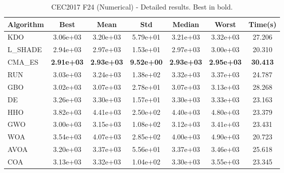 \begin{table}[H]
\centering\small
\caption{CEC2017 F24 (Numerical) - Detailed results. Best in bold.}
\label{tab:cec2017_F24}
\begin{tabular}{lcccccc}
\toprule
\textbf{Algorithm} & \textbf{Best} & \textbf{Mean} & \textbf{Std} & \textbf{Median} & \textbf{Worst} & \textbf{Time(s)} \\
\midrule
KDO & 3.06e+03 & 3.20e+03 & 5.79e+01 & 3.21e+03 & 3.32e+03 & 27.206 \\
L_SHADE & 2.94e+03 & 2.97e+03 & 1.53e+01 & 2.97e+03 & 3.00e+03 & 20.310 \\
CMA_ES & \textbf{2.91e+03} & \textbf{2.93e+03} & \textbf{9.52e+00} & \textbf{2.93e+03} & \textbf{2.95e+03} & \textbf{30.413} \\
RUN & 3.03e+03 & 3.24e+03 & 1.38e+02 & 3.32e+03 & 3.37e+03 & 24.787 \\
GBO & 3.02e+03 & 3.07e+03 & 2.78e+01 & 3.07e+03 & 3.13e+03 & 28.268 \\
DE & 3.26e+03 & 3.30e+03 & 1.57e+01 & 3.30e+03 & 3.33e+03 & 23.163 \\
HHO & 3.82e+03 & 4.41e+03 & 2.50e+02 & 4.40e+03 & 4.80e+03 & 23.379 \\
GWO & 3.00e+03 & 3.15e+03 & 1.08e+02 & 3.12e+03 & 3.41e+03 & 23.431 \\
WOA & 3.54e+03 & 4.07e+03 & 2.85e+02 & 4.00e+03 & 4.90e+03 & 20.723 \\
AVOA & 3.20e+03 & 3.37e+03 & 5.56e+01 & 3.37e+03 & 3.46e+03 & 25.618 \\
COA & 3.13e+03 & 3.32e+03 & 1.04e+02 & 3.30e+03 & 3.55e+03 & 23.345 \\
\bottomrule
\end{tabular}
\end{table}
